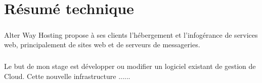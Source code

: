 \chapter*{Résumé technique}
\paragraph*{}
	Alter Way Hosting propose à ses clients l'hébergement et l'infogérance de
	services web, principalement de sites web et de serveurs de messageries.

\paragraph*{}
	Le but de mon stage est développer ou modifier un logiciel existant de gestion
	de Cloud. Cette nouvelle infrastructure ......

\paragraph*{}
	\lipsum[1]